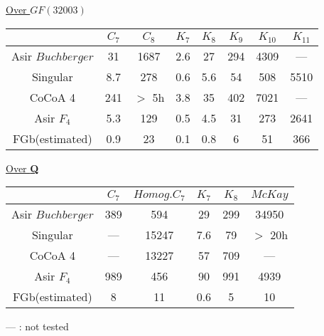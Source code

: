 \begin{slide}{}

\underline{Over $GF(32003)$}
\begin{center}
\begin{tabular}{|c||c|c|c|c|c|c|c|} \hline
		& $C_7$ & $C_8$ & $K_7$ & $K_8$ & $K_9$ & $K_{10}$ & $K_{11}$ \\ \hline
Asir $Buchberger$ 	& 31 & 1687  & 2.6  & 27 & 294  & 4309 & --- \\ \hline
Singular & 8.7 & 278 & 0.6 & 5.6 & 54 & 508 & 5510 \\ \hline
CoCoA 4 & 241 & $>$ 5h & 3.8 & 35 & 402 &7021  & --- \\ \hline\hline
Asir $F_4$ 	& 5.3 & 129 & 0.5  & 4.5 & 31  & 273 & 2641 \\ \hline
FGb(estimated)	& 0.9 & 23 & 0.1 & 0.8 & 6 & 51 & 366 \\ \hline
\end{tabular}
\end{center}

\underline{Over {\bf Q}}

\begin{center}
\begin{tabular}{|c||c|c|c|c|c|} \hline
		& $C_7$ & $Homog. C_7$ & $K_7$ & $K_8$ & $McKay$ \\ \hline
Asir $Buchberger$ 	& 389 & 594 & 29 & 299 & 34950 \\ \hline
Singular & --- & 15247 & 7.6 & 79 & $>$ 20h \\ \hline
CoCoA 4 & --- & 13227 & 57 & 709 & --- \\ \hline\hline
Asir $F_4$ 	&  989 & 456 & 90 & 991 & 4939 \\ \hline
FGb(estimated)	& 8 &11 & 0.6 & 5 & 10 \\ \hline
\end{tabular}
\end{center}
--- : not tested
\end{slide}

